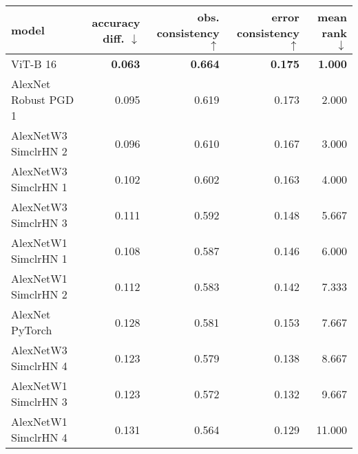 \begin{tabular}{lrrrr}
\toprule
model & accuracy diff. $\downarrow$ & obs. consistency $\uparrow$ & error consistency $\uparrow$ & mean rank $\downarrow$ \\
\midrule
ViT-B 16 & \textbf{0.063} & \textbf{0.664} & \textbf{0.175} & \textbf{1.000} \\
AlexNet Robust PGD 1 & 0.095 & 0.619 & 0.173 & 2.000 \\
AlexNetW3 SimclrHN 2 & 0.096 & 0.610 & 0.167 & 3.000 \\
AlexNetW3 SimclrHN 1 & 0.102 & 0.602 & 0.163 & 4.000 \\
AlexNetW3 SimclrHN 3 & 0.111 & 0.592 & 0.148 & 5.667 \\
AlexNetW1 SimclrHN 1 & 0.108 & 0.587 & 0.146 & 6.000 \\
AlexNetW1 SimclrHN 2 & 0.112 & 0.583 & 0.142 & 7.333 \\
AlexNet PyTorch & 0.128 & 0.581 & 0.153 & 7.667 \\
AlexNetW3 SimclrHN 4 & 0.123 & 0.579 & 0.138 & 8.667 \\
AlexNetW1 SimclrHN 3 & 0.123 & 0.572 & 0.132 & 9.667 \\
AlexNetW1 SimclrHN 4 & 0.131 & 0.564 & 0.129 & 11.000 \\
\bottomrule
\end{tabular}

